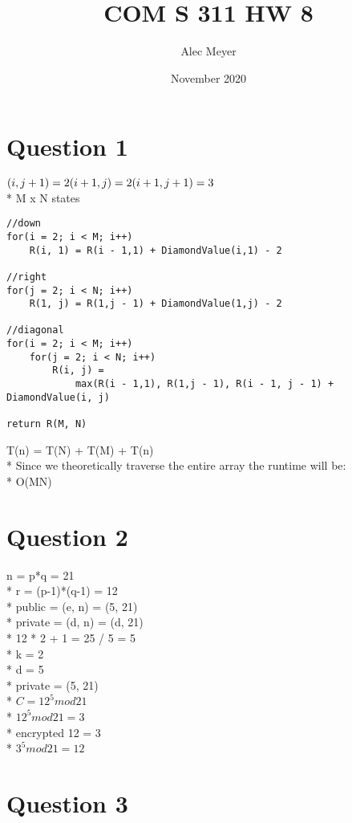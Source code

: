 \documentclass{article}
\title{COM S 311 HW 8}
\author{Alec Meyer}
\date{November 2020}
\begin{document}
\maketitle

\section*{Question 1}

$(i, j + 1) = 2 \\*
(i + 1, j) = 2 \\*
(i + 1, j+ 1) = 3$ \\*
M x N states

\begin{lstlisting}
//down
for(i = 2; i < M; i++)
    R(i, 1) = R(i - 1,1) + DiamondValue(i,1) - 2
    
//right
for(j = 2; i < N; i++)
    R(1, j) = R(1,j - 1) + DiamondValue(1,j) - 2
    
//diagonal
for(i = 2; i < M; i++)
    for(j = 2; i < N; i++)
        R(i, j) = 
            max(R(i - 1,1), R(1,j - 1), R(i - 1, j - 1) + DiamondValue(i, j)

return R(M, N)
\end{lstlisting}
T(n) = T(N) + T(M) + T(n)\\*
Since we theoretically traverse the entire array the runtime will be:\\*
O(MN)

\section*{Question 2}
n = p*q = 21\\*
r = (p-1)*(q-1) = 12\\*
public = (e, n) = (5, 21)\\*
private = (d, n) = (d, 21)\\*
12 * 2 + 1 = 25 / 5 = 5\\*
k = 2\\*
d = 5\\*
private = (5, 21)\\*
$C = 12^5 mod 21$\\*
$12^5 mod 21 = 3$\\*
encrypted 12 = 3\\*
$3^5 mod 21 = 12$
\section*{Question 3}
\end{document}
